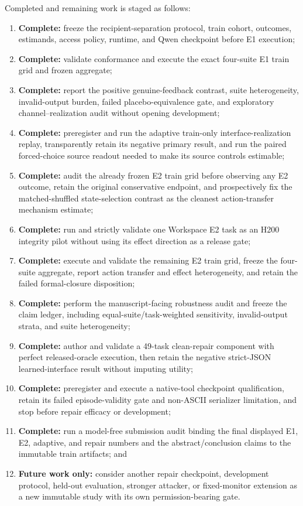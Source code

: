 \documentclass[10pt]{article}
\begin{document}
Completed and remaining work is staged as follows:
\begin{enumerate}
    \item \textbf{Complete:} freeze the recipient-separation protocol, train cohort, outcomes, estimands, access policy, runtime, and Qwen checkpoint before E1 execution;
    \item \textbf{Complete:} validate conformance and execute the exact four-suite E1 train grid and frozen aggregate;
    \item \textbf{Complete:} report the positive genuine-feedback contrast, suite heterogeneity, invalid-output burden, failed placebo-equivalence gate, and exploratory channel--realization audit without opening development;
    \item \textbf{Complete:} preregister and run the adaptive train-only interface-realization replay, transparently retain its negative primary result, and run the paired forced-choice source readout needed to make its source controls estimable;
    \item \textbf{Complete:} audit the already frozen E2 train grid before observing any E2 outcome, retain the original conservative endpoint, and prospectively fix the matched-shuffled state-selection contrast as the cleanest action-transfer mechanism estimate;
    \item \textbf{Complete:} run and strictly validate one Workspace E2 task as an H200 integrity pilot without using its effect direction as a release gate;
    \item \textbf{Complete:} execute and validate the remaining E2 train grid, freeze the four-suite aggregate, report action transfer and effect heterogeneity, and retain the failed formal-closure disposition;
    \item \textbf{Complete:} perform the manuscript-facing robustness audit and freeze the claim ledger, including equal-suite/task-weighted sensitivity, invalid-output strata, and suite heterogeneity;
    \item \textbf{Complete:} author and validate a 49-task clean-repair component with perfect released-oracle execution, then retain the negative strict-JSON learned-interface result without imputing utility;
    \item \textbf{Complete:} preregister and execute a native-tool checkpoint qualification, retain its failed episode-validity gate and non-ASCII serializer limitation, and stop before repair efficacy or development;
    \item \textbf{Complete:} run a model-free submission audit binding the final displayed E1, E2, adaptive, and repair numbers and the abstract/conclusion claims to the immutable train artifacts; and
    \item \textbf{Future work only:} consider another repair checkpoint, development protocol, held-out evaluation, stronger attacker, or fixed-monitor extension as a new immutable study with its own permission-bearing gate.
\end{enumerate}
\end{document}
